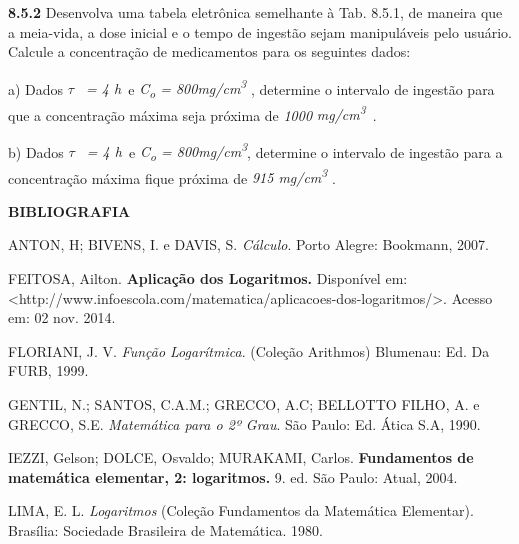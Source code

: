\documentclass[12pt]{article}
\begin{document}
\begin{enumerate}
\begin{justify}
\textbf{8.5.2 }Desenvolva uma tabela eletrônica semelhante à Tab. 8.5.1, de maneira que a meia-vida, a dose inicial e o tempo de ingestão sejam manipuláveis pelo usuário. Calcule a concentração de medicamentos para os seguintes dados:
\end{justify}\par

\begin{justify}
a) Dados \textit{$ \tau$ \  = 4 h\  }e \textit{C\textsubscript{o} = 800mg/cm\textsuperscript{3 }}, determine o intervalo de ingestão para que a concentração máxima seja próxima de \textit{1000} \textit{mg/cm\textsuperscript{3}}\ .\ \ \   
\end{justify}\par

\begin{justify}
b) Dados \textit{$ \tau$ \  = 4 h\  }e \textit{C\textsubscript{o} = 800mg/cm\textsuperscript{3}}, determine o intervalo de ingestão para a concentração máxima fique próxima de \textit{915 mg/cm\textsuperscript{3}} .
\end{justify}\par


\vspace{\baselineskip}
\textbf{BIBLIOGRAFIA}\par

ANTON, H; BIVENS, I. e DAVIS, S. \textit{Cálculo}. Porto Alegre: Bookmann, 2007.\par

\setlength{\parskip}{0.0pt}
FEITOSA, Ailton. \textbf{Aplicação dos Logaritmos. }Disponível em: <http://www.infoescola.com/matematica/aplicacoes-dos-logaritmos/>. Acesso em: 02 nov. 2014.\par

\setlength{\parskip}{8.04pt}
FLORIANI, J. V. \textit{Função Logarítmica}. (Coleção Arithmos) Blumenau: Ed. Da FURB, 1999.\par

GENTIL, N.; SANTOS, C.A.M.; GRECCO, A.C; BELLOTTO FILHO, A. e GRECCO, S.E. \textit{Matemática para o 2º Grau}. São Paulo: Ed. Ática S.A, 1990.\par

\setlength{\parskip}{0.0pt}
IEZZI, Gelson; DOLCE, Osvaldo; MURAKAMI, Carlos.\textbf{ Fundamentos de matemática elementar, 2: logaritmos.} 9. ed. São Paulo: Atual, 2004.\par

\setlength{\parskip}{8.04pt}
LIMA, E. L. \textit{Logaritmos} (Coleção Fundamentos da Matemática Elementar). Brasília: Sociedade Brasileira de Matemática. 1980.\par


\end{enumerate}
\end{document}

